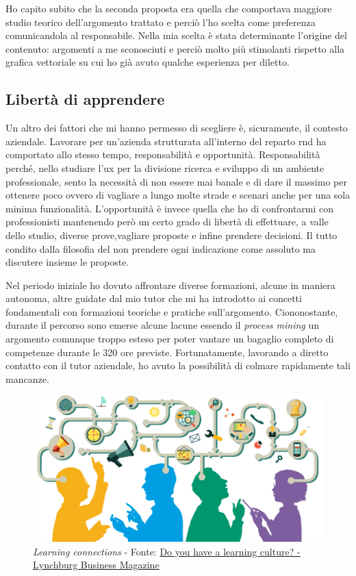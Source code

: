 Ho capito subito che la seconda proposta era quella che comportava maggiore studio teorico dell'argomento trattato e perciò l'ho scelta come preferenza comunicandola al responsabile. Nella mia scelta è stata determinante l'origine del contenuto: argomenti a me sconosciuti e perciò molto più stimolanti rispetto alla grafica vettoriale su cui ho già avuto qualche esperienza per diletto.
\subsection{Libertà di apprendere}
Un altro dei fattori che mi hanno permesso di scegliere è, sicuramente, il contesto aziendale.
Lavorare per un'azienda strutturata all'interno del reparto \acrshort{rnd} ha comportato allo stesso tempo, responsabilità e opportunità.
Responsabilità perché, nello studiare l'\acrshort{ux} per la divisione ricerca e sviluppo di un ambiente professionale, sento la necessità di non essere mai banale e di dare il massimo per ottenere poco ovvero di vagliare a lungo molte strade e scenari anche per una sola minima funzionalità.
L'opportunità è invece quella che ho di confrontarmi con professionisti mantenendo però un certo grado di libertà di effettuare, a valle dello studio, diverse prove,vagliare proposte e infine prendere decisioni. Il tutto condito dalla filosofia del non prendere ogni indicazione come assoluto ma discutere insieme le proposte.

Nel periodo iniziale ho dovuto affrontare diverse formazioni, alcune in maniera autonoma, altre guidate dal mio tutor che mi ha introdotto ai concetti fondamentali con formazioni teoriche e pratiche sull'argomento.
Ciononostante, durante il percorso sono emerse alcune lacune essendo il \textit{process mining} un argomento comunque troppo esteso per poter vantare un bagaglio completo di competenze durante le 320 ore previste. Fortunatamente, lavorando a diretto contatto con il tutor aziendale, ho avuto la possibilità di colmare rapidamente tali mancanze.
\begin{figure}[H]
    \centering
    \includegraphics[width=\columnwidth]{immagini/learning_connection.jpg}
    \caption{\textit{Learning connections} - Fonte: \href{https://lynchburgbusinessmag.com/do-you-have-a-learning-culture/}{Do you have a learning culture? - Lynchburg Business Magazine}}
    \label{fig:learningConnection}
\end{figure}
\newpage
